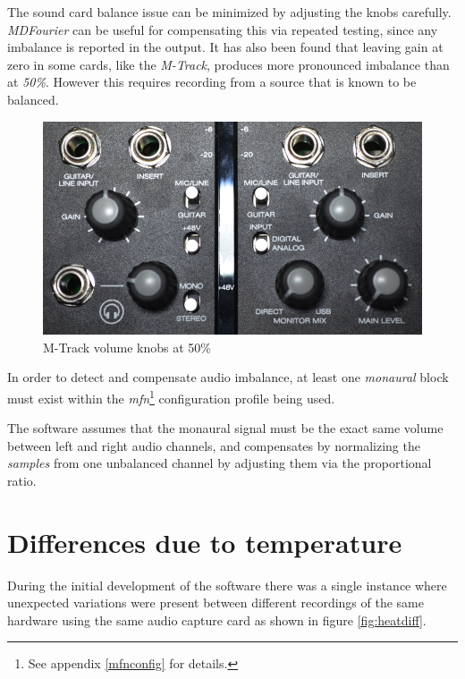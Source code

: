 \documentclass[10pt,a4paper]{report}
\begin{document}
\begin{appendices}
The sound card balance issue can be minimized by adjusting the knobs carefully. \textit{MDFourier} can be useful for compensating this via repeated testing, since any imbalance is reported in the output. It has also been found that leaving gain at zero in some cards, like the \textit{M-Track}, produces more pronounced imbalance than at \textit{50\%}. However this requires recording from a source that is known to be balanced.

\begin{figure}[H]
	\centering
	\includegraphics[width=0.8\linewidth]{images/imbalance/mtrack.png}
	\caption[M-Track knobs]{M-Track volume knobs at 50\%}
	\label{fig:mtrackknobs}
\end{figure}

In order to detect and compensate audio imbalance, at least one \textit{monaural} block must exist within the \textit{mfn}\footnote{See appendix \ref{mfnconfig} for details.} configuration profile being used.

The software assumes that the monaural signal must be the exact same volume between left and right audio channels, and compensates by normalizing the \textit{samples} from one unbalanced channel by adjusting them via the proportional ratio. 

\chapter{Differences due to temperature}

During the initial development of the software there was a single instance where unexpected variations were present between different recordings of the same hardware using the same audio capture card as shown in figure \ref{fig:heatdiff}.


\end{appendices}
\end{document}
